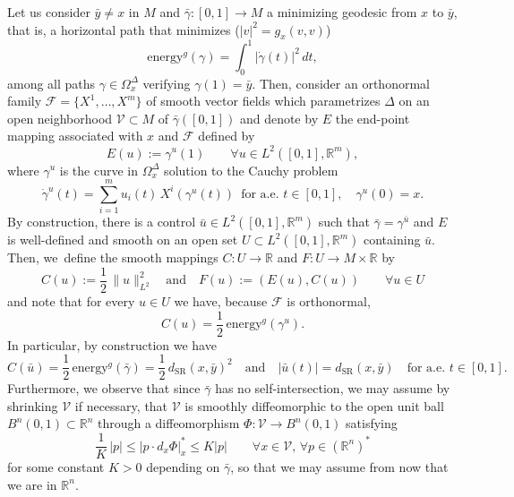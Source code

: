 \documentclass[JEP,XML,SOM,Unicode,NoFloatCountersInSection,published]{cedram}
\newcommand{\SR}{{\scriptscriptstyle\mathrm{SR}}}
\newcommand\R{\mathbb R}
\theoremstyle{definition}
\begin{document}
Let us consider $\bar{y}\neq x$ in $M$ and $\bar{\gamma} : [0,1] \to M$ a minimizing geodesic from $x$ to $\bar{y}$, that is, a horizontal path that minimizes ($|v|^2=g_x(v,v)$)
\[
\mathrm{energy}^g(\gamma)= \int_0^1 |\dot{\gamma}(t)|^2\, dt,
\]
among all paths $\gamma\in \Omega_x^{\Delta}$ verifying $\gamma(1)=\bar{y}$. Then, consider an orthonormal family $\mathcal{F} = \{X^1, \ldots, X^m\}$ of smooth vector fields which parametrizes $\Delta$ on an open neighborhood $\mathcal{V}\subset M$ of $\bar{\gamma}([0,1])$ and denote by $E$ the end-point mapping associated with $x$ and $\mathcal{F}$ defined by
\[
E(u) := \gamma^u(1) \qquad \forall u \in L^2([0,1],\R^m),
\]
where $\gamma^u$ is the curve in $\Omega_x^{\Delta}$ solution to the Cauchy problem
\[
\dot{\gamma}^u (t) = \sum_{i=1}^m u_i(t) \, X^i \left(\gamma^u(t)\right) \, \text{ for a.e. } t \in [0,1], \quad \gamma^u(0)=x.
\]
By construction, there is a control $\bar{u} \in L^2([0,1],\R^m)$ such that $\bar{\gamma}=\gamma^{\bar{u}}$ and $E$ is well-defined and smooth on an open set $U\subset L^2([0,1],\R^m)$ containing $\bar{u}$. Then, we~define the smooth mappings $C: U \to \R$ and $F: U \to M\times \R$ by
\begin{equation}\label{10oct1}
C(u):= \frac{1}{2}\, \| u\|_{L^2}^2 \quad \text{and} \quad F(u) := \left(E (u), C(u) \right) \qquad \forall u \in U
\end{equation}
and note that for every $u\in U$ we have, because $\mathcal{F}$ is orthonormal,
\[
C(u) = \frac{1}{2}\, \text{energy}^g(\gamma^u).
\]
In particular, by construction we have
\[
C(\bar{u}) = \frac{1}{2} \, \text{energy}^g(\bar{\gamma}) = \frac{1}{2}\, d_{\SR}(x,\bar{y})^2
\quad
\text{and} \quad \left| \bar{u}(t) \right| = d_{\SR}(x,\bar{y}) \quad \text{for a.e. } t \in [0,1].
\]
Furthermore, we observe that since $\bar{\gamma}$ has no self-intersection, we may assume by shrinking $\mathcal{V}$ if necessary, that $\mathcal{V}$ is smoothly diffeomorphic to the open unit ball $B^n(0,1) \subset \R^n$ through a diffeomorphism $\Phi: \mathcal{V} \to B^n(0,1)$ satisfying
\begin{equation}\label{ESTDiffeo}
\frac{1}{K}\,|p| \leq \left| p \cdot d_x\Phi \right|^*_x \leq K |p| \qquad \forall x \in \mathcal{V}, \, \forall p \in (\R^n)^*
\end{equation}
for some constant $K>0$ depending on $\bar{\gamma}$, so that we may assume from now that we are in $\R^n$.
\end{document}
